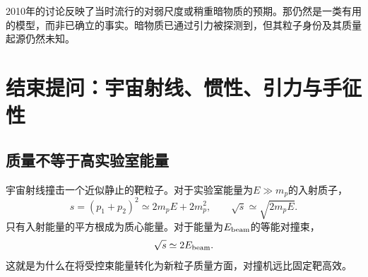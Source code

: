 \begin{classroomqa}
\end{classroomqa}

2010年的讨论反映了当时流行的对弱尺度或稍重暗物质的预期。那仍然是一类有用的模型，而非已确立的事实。暗物质已通过引力被探测到，但其粒子身份及其质量起源仍然未知。

\section{结束提问：宇宙射线、惯性、引力与手征性}

\subsection{质量不等于高实验室能量}

\begin{classroomqa}
\end{classroomqa}

宇宙射线撞击一个近似静止的靶粒子。对于实验室能量为\(E\gg m_p\)的入射质子，
\begin{equation}
  s=(p_1+p_2)^2
  \simeq2m_pE+2m_p^2,
  \qquad
  \sqrt{s}\simeq\sqrt{2m_pE}.
  \label{eq:l09-fixed-target-s}
\end{equation}
只有入射能量的平方根成为质心能量。对于能量为\(E_{\rm beam}\)的等能对撞束，
\begin{equation}
  \sqrt{s}\simeq2E_{\rm beam}.
  \label{eq:l09-collider-s}
\end{equation}
这就是为什么在将受控束能量转化为新粒子质量方面，对撞机远比固定靶高效。

\begin{classroomqa}
\end{classroomqa}

